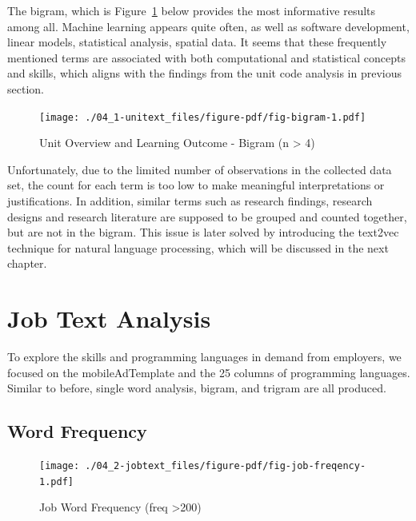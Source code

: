 \documentclass[
  letterpaper,
  DIV=11,
  numbers=noendperiod]{scrreport}
\begin{document}
The bigram, which is Figure~\ref{fig-bigram} below provides the most
informative results among all. Machine learning appears quite often, as
well as software development, linear models, statistical analysis,
spatial data. It seems that these frequently mentioned terms are
associated with both computational and statistical concepts and skills,
which aligns with the findings from the unit code analysis in previous
section.

\begin{figure}

{\centering \texttt{[image: ./04\_1-unitext\_files/figure-pdf/fig-bigram-1.pdf]}

}

\caption{\label{fig-bigram}Unit Overview and Learning Outcome - Bigram
(n \textgreater{} 4)}

\end{figure}

Unfortunately, due to the limited number of observations in the
collected data set, the count for each term is too low to make
meaningful interpretations or justifications. In addition, similar terms
such as research findings, research designs and research literature are
supposed to be grouped and counted together, but are not in the bigram.
This issue is later solved by introducing the text2vec technique for
natural language processing, which will be discussed in the next
chapter.

\hypertarget{job-text-analysis}{%
\chapter{Job Text Analysis}\label{job-text-analysis}}

To explore the skills and programming languages in demand from
employers, we focused on the mobileAdTemplate and the 25 columns of
programming languages. Similar to before, single word analysis, bigram,
and trigram are all produced.

\hypertarget{sec-word-frequency}{%
\section{Word Frequency}\label{sec-word-frequency}}

\begin{figure}

{\centering \texttt{[image: ./04\_2-jobtext\_files/figure-pdf/fig-job-freqency-1.pdf]}

}

\caption{\label{fig-job-freqency}Job Word Frequency (freq
\textgreater200)}

\end{figure}
\end{document}
